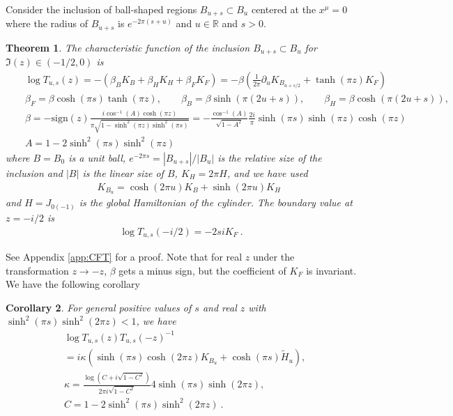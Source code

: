 \documentclass[a4paper,11pt]{article}
\newtheorem{theorem}{Theorem}
\newtheorem{corollary}[theorem]{Corollary}
\theoremstyle{definition}
\newcommand{\nn}{\nonumber}
\newcommand{\lb}{\left(}
\newcommand{\rb}{\right)}
\newcommand{\p}{\partial}
\begin{document}
Consider the inclusion of ball-shaped regions $B_{u+s}\subset B_{u}$ centered at the $x^\mu=0$ where the radius of $B_{u+s}$ is $e^{-2\pi (s+u)}$ and $u\in \mathbb{R}$ and $s>0$. 
\begin{theorem}\label{theoremCFT}
    The characteristic function of the inclusion $B_{u+s}\subset B_u$ for $\Im (z)\in (-1/2,0)$ is
    \begin{eqnarray}
        &&\log T_{u,s}(z)=-(\beta_BK_B+\beta_H K_H+\beta_F K_F)=-\beta \lb\frac{1}{2\pi}\p_uK_{B_{u+s/2}} +\tanh(\pi z)K_F\rb\nn\\
        &&\beta_F=\beta\cosh(\pi s)\tanh(\pi z),\qquad\beta_B=\beta \sinh(\pi (2u+s)),\qquad 
        \beta_H=\beta\cosh(\pi (2u+s)),\nn\\
        &&\beta=-\text{sign}(z)\frac{i\cos^{-1}(A)  \cosh{(\pi z)}}{\pi\sqrt{1-\sinh^2(\pi z)\sinh^2(\pi s)}}= -\frac{\cos^{-1}(A)}{\sqrt{1-A^2}} \frac{2i}{\pi}\sinh(\pi s)\sinh(\pi z)\cosh(\pi z) \nn\\
        &&A=1-2\sinh^2(\pi s)\sinh^2(\pi z)
    \end{eqnarray}
where $B=B_0$ is a unit ball, $e^{-2\pi s}=|B_{u+s}|/|B_u|$ is the relative size of the inclusion and $|B|$ is the linear size of $B$, $K_H = 2\pi H$, and we have used 
\begin{eqnarray}
        &&K_{B_u}=\cosh(2\pi u)K_B+\sinh(2\pi u) K_H
\end{eqnarray}
and $H=J_{0(-1)}$ is the global Hamiltonian of the cylinder. The boundary value at $z=-i/2$ is
    \begin{eqnarray}
        \log T_{u,s}(-i/2)= -2 s i K_F\ .
    \end{eqnarray}
\end{theorem}
See Appendix \ref{app:CFT} for a proof. Note that for real $z$ under the transformation $z\to -z$, $\beta$ gets a minus sign, but the coefficient of $K_F$ is invariant. We have the following corollary
\begin{corollary}
For general positive values of $s$ and real $z$ with $\sinh^2(\pi s)\sinh^2(2\pi z) < 1$, we have
\begin{align}
    &\log T_{u,s}(z)T_{u,s}(-z)^{-1} \nn\\
    &= i\kappa(\sinh(\pi s) \cosh(2\pi z) K_{B_u} + \cosh(\pi s) \tilde{H}_u),\\
    &\kappa = \frac{\log(C+i\sqrt{1-C^2})}{2\pi i\sqrt{1-C^2}} 4\sinh(\pi s) \sinh(2\pi z),\\
    &C = 1 -2 \sinh^2(\pi s)\sinh^2(2\pi z)\ .
\end{align}    
\end{corollary}
\end{document}
